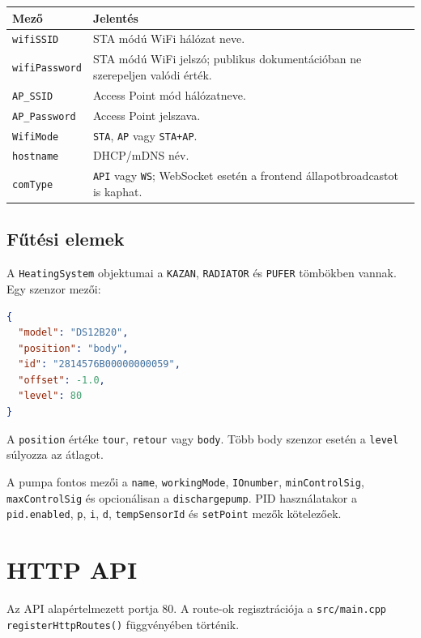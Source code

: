 \documentclass[11pt,a4paper]{article}
\begin{document}
\begin{longtable}{p{}p{}}
\toprule
Mező & Jelentés \\
\midrule
\texttt{wifiSSID} & STA módú WiFi hálózat neve. \\
\texttt{wifiPassword} & STA módú WiFi jelszó; publikus dokumentációban ne szerepeljen valódi érték. \\
\texttt{AP\_SSID} & Access Point mód hálózatneve. \\
\texttt{AP\_Password} & Access Point jelszava. \\
\texttt{WifiMode} & \texttt{STA}, \texttt{AP} vagy \texttt{STA+AP}. \\
\texttt{hostname} & DHCP/mDNS név. \\
\texttt{comType} & \texttt{API} vagy \texttt{WS}; WebSocket esetén a frontend állapotbroadcastot is kaphat. \\
\bottomrule
\end{longtable}

\subsection{Fűtési elemek}

A \texttt{HeatingSystem} objektumai a \texttt{KAZAN}, \texttt{RADIATOR} és \texttt{PUFER} tömbökben vannak. Egy szenzor mezői:

\begin{lstlisting}[language=json]
{
  "model": "DS12B20",
  "position": "body",
  "id": "2814576B00000000059",
  "offset": -1.0,
  "level": 80
}
\end{lstlisting}

A \texttt{position} értéke \texttt{tour}, \texttt{retour} vagy \texttt{body}. Több body szenzor esetén a \texttt{level} súlyozza az átlagot.

A pumpa fontos mezői a \texttt{name}, \texttt{workingMode}, \texttt{IOnumber}, \texttt{minControlSig}, \texttt{maxControlSig} és opcionálisan a \texttt{dischargepump}. PID használatakor a \texttt{pid.enabled}, \texttt{p}, \texttt{i}, \texttt{d}, \texttt{tempSensorId} és \texttt{setPoint} mezők kötelezőek.

\section{HTTP API}

Az API alapértelmezett portja 80. A route-ok regisztrációja a \texttt{src/main.cpp} \texttt{registerHttpRoutes()} függvényében történik.
\end{document}
